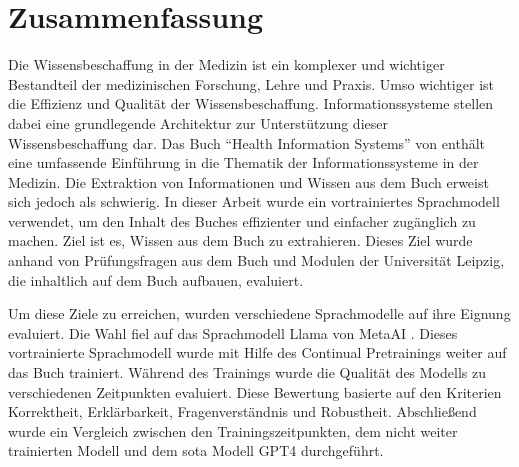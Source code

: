\chapter*{Zusammenfassung}
%

Die Wissensbeschaffung in der Medizin ist ein komplexer und wichtiger Bestandteil der medizinischen Forschung, Lehre und Praxis.
Umso wichtiger ist die Effizienz und Qualität der Wissensbeschaffung.
Informationssysteme stellen dabei eine grundlegende Architektur zur Unterstützung dieser Wissensbeschaffung dar.
Das Buch \enquote{Health Information Systems} von \citet{bb} enthält eine umfassende Einführung in die Thematik der Informationssysteme in der Medizin.
Die Extraktion von Informationen und Wissen aus dem Buch erweist sich jedoch als schwierig.
In dieser Arbeit wurde ein vortrainiertes Sprachmodell verwendet, um den Inhalt des Buches effizienter und einfacher zugänglich zu machen.
Ziel ist es, Wissen aus dem Buch zu extrahieren.
Dieses Ziel wurde anhand von Prüfungsfragen aus dem Buch und Modulen der Universität Leipzig, die inhaltlich auf dem Buch aufbauen, evaluiert.

Um diese Ziele zu erreichen, wurden verschiedene Sprachmodelle auf ihre Eignung evaluiert.
Die Wahl fiel auf das Sprachmodell Llama von MetaAI \citep{llama2}.
Dieses vortrainierte Sprachmodell wurde mit Hilfe des Continual Pretrainings weiter auf das Buch trainiert.
Während des Trainings wurde die Qualität des Modells zu verschiedenen Zeitpunkten evaluiert.
Diese Bewertung basierte auf den Kriterien Korrektheit, Erklärbarkeit, Fragenverständnis und Robustheit.
Abschließend wurde ein Vergleich zwischen den Trainingszeitpunkten, dem nicht weiter trainierten Modell und dem \ac{sota} Modell GPT4 durchgeführt.\\

